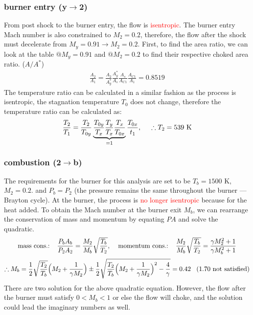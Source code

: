 \documentclass[a4paper,10pt]{article}
\begin{document}
\vspace*{-0.4cm}
\subsubsection{burner entry (y$\rightarrow$2)}
From post shock to the burner entry, the flow is \textcolor{red}{isentropic}. The burner entry Mach number is also constrained to $M_2=0.2$, therefore, the flow after the shock must decelerate from $M_y = 0.91\rightarrow M_2=0.2$. First, to find the area ratio, we can look at the table $@M_y=0.91$ and $@M_2=0.2$ to find their respective choked area ratio. ($A/A^*$)
\begin{gather*}
    \frac{A_2}{A_1} = \frac{A_2}{A^*_y}\frac{A_y^*}{A_s}\frac{A_s}{A_{C1}}\frac{A_{C1}}{A_1} = 0.8519
\end{gather*}
The temperature ratio can be calculated in a similar fashion as the process is isentropic, the stagnation temperature $T_0$ does not change, therefore the temperature ratio can be calculated as:
\begin{gather*}
    \frac{T_2}{T_1}=\frac{T_2}{T_{0y}}\underbrace{\frac{T_{0y}}{T_x}\frac{T_y}{T_x}\frac{T_x}{T_{0x}}}_{=1}\frac{T_{0x}}{t_1},\hspace*{0.5cm}\therefore T_2 = 539\text{ K}
\end{gather*}

\vspace*{-0.4cm}
\subsubsection{combustion (2$\rightarrow$b)}
The requirements for the burner for this analysis are set to be $T_b = 1500$ K, $M_2 = 0.2$. and $P_b=P_2$ (the pressure remains the same throughout the burner --- Brayton cycle). At the burner, the process is \textcolor{red}{no longer isentropic} because for the heat added. To obtain the Mach number at the burner exit $M_b$, we can rearrange the conservation of mass and momentum by equating $PA$ and solve the quadratic. 
\begin{gather*}
    \text{mass cons.:}\hspace*{0.4cm}\frac{P_bA_b}{P_2A_2}=\frac{M_2}{M_b}\sqrt{\frac{T_b}{T_2}},\hspace*{0.4cm}\text{momentum cons.:}\hspace*{0.4cm}\frac{M_2}{M_b}\sqrt{\frac{T_b}{T_2}} = \frac{\gamma M_2^2+1}{\gamma M_b^2+1}\\[0.1cm]
    \therefore M_b = \frac{1}{2}\sqrt{\frac{T_2}{T_b}}\Big(M_2+\frac{1}{\gamma M_2}\Big)\pm\frac{1}{2}\sqrt{\frac{T_2}{T_b}\Big(M_2+\frac{1}{\gamma M_2}\Big)^2-\frac{4}{\gamma}} = 0.42\hspace*{0.3cm}(1.70\text{ not satisfied})
\end{gather*}
There are two solution for the above quadratic equation. However, the flow after the burner must satisfy $0<M_b<1$ or else the flow will choke, and the solution could lead the imaginary numbers as well.\par 
\end{document}
